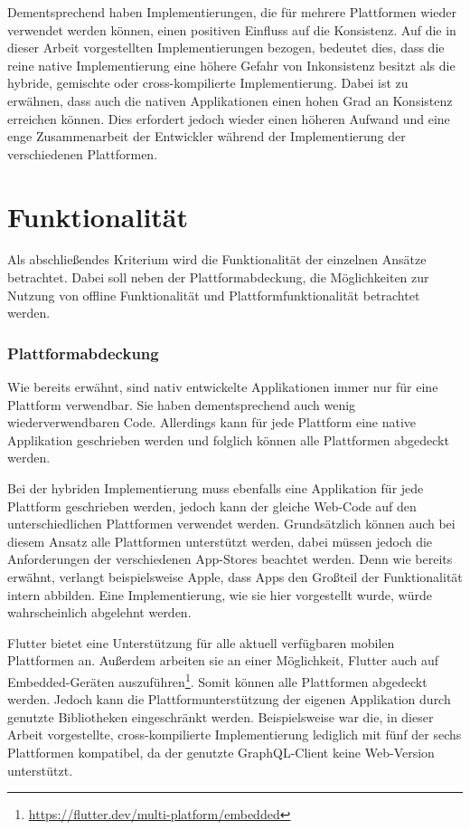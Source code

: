Dementsprechend haben Implementierungen, die für mehrere Plattformen wieder verwendet werden können, einen positiven Einfluss auf die Konsistenz.
Auf die in dieser Arbeit vorgestellten Implementierungen bezogen, bedeutet dies, dass die reine native Implementierung eine höhere Gefahr von Inkonsistenz besitzt als die hybride, gemischte oder cross-kompilierte Implementierung.
Dabei ist zu erwähnen, dass auch die nativen Applikationen einen hohen Grad an Konsistenz erreichen können. Dies erfordert jedoch wieder einen höheren Aufwand und eine enge Zusammenarbeit der Entwickler während der Implementierung der verschiedenen Plattformen.

\section{Funktionalität}
Als abschließendes Kriterium wird die Funktionalität der einzelnen Ansätze betrachtet. Dabei soll neben der Plattformabdeckung, die Möglichkeiten zur Nutzung von offline Funktionalität und Plattformfunktionalität betrachtet werden.

\subsubsection{Plattformabdeckung}
Wie bereits erwähnt, sind nativ entwickelte Applikationen immer nur für eine Plattform verwendbar. Sie haben dementsprechend auch wenig wiederverwendbaren Code. Allerdings kann für jede Plattform eine native Applikation geschrieben werden und folglich können alle Plattformen abgedeckt werden.

Bei der hybriden Implementierung muss ebenfalls eine Applikation für jede Plattform geschrieben werden, jedoch kann der gleiche Web-Code auf den unterschiedlichen Plattformen verwendet werden. Grundsätzlich können auch bei diesem Ansatz alle Plattformen unterstützt werden, dabei müssen jedoch die Anforderungen der verschiedenen App-Stores beachtet werden. Denn wie bereits erwähnt, verlangt beispielsweise Apple, dass Apps den Großteil der Funktionalität intern abbilden. Eine Implementierung, wie sie hier vorgestellt wurde, würde wahrscheinlich abgelehnt werden.

Flutter bietet eine Unterstützung für alle aktuell verfügbaren mobilen Plattformen an. Außerdem arbeiten sie an einer Möglichkeit, Flutter auch auf Embedded-Geräten auszuführen\footnote{\url{https://flutter.dev/multi-platform/embedded}}.
Somit können alle Plattformen abgedeckt werden. Jedoch kann die Plattformunterstützung der eigenen Applikation durch genutzte Bibliotheken eingeschränkt werden. Beispielsweise war die, in dieser Arbeit vorgestellte, cross-kompilierte Implementierung lediglich mit fünf der sechs Plattformen kompatibel, da der genutzte GraphQL-Client keine Web-Version unterstützt.

